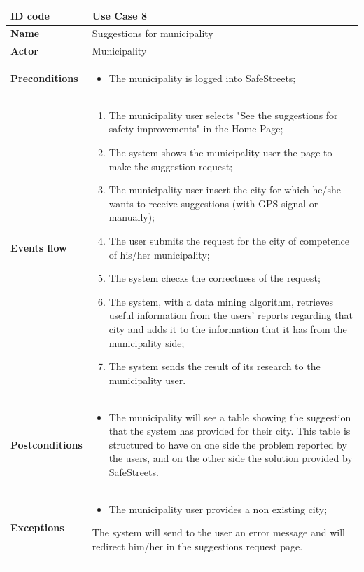 \documentclass[titlepage]{article}
\begin{document}
\newpage



\begin{longtable}{| p{3 cm} | p{10 cm} |} 
\hline

\textbf{ID code} & Use Case 8 \\ \hline
\textbf{Name} & Suggestions for municipality \\ \hline
\textbf{Actor} & Municipality \\ \hline
\textbf{Preconditions} &
\begin{itemize}
\item The municipality is logged into SafeStreets;
\end{itemize} \\ \hline

\textbf{Events flow} & 
\begin{enumerate}
\item The municipality user selects "See the suggestions for safety improvements" in the Home Page;
\item The system shows the municipality user the page to make the suggestion request;
\item The municipality user insert the city for which he/she wants to receive suggestions (with GPS signal or manually);
\item The user submits the request for the city of competence of his/her municipality;
\item The system checks the correctness of the request;
\item The system, with a data mining algorithm, retrieves useful information from the users' reports regarding that city and adds it to the information that it has from the municipality side;
\item The system sends the result of its research to the municipality user.
\end{enumerate} \\ \hline

\textbf{Postconditions} &
\begin{itemize}
\item The municipality will see a table showing the suggestion that the system has provided for their city. This table is structured to have on one side the problem reported by the users, and on the other side the solution provided by SafeStreets.
\end{itemize} \\ \hline

\textbf{Exceptions} &
\begin{itemize}

\item The municipality user provides a non existing city;
\end{itemize}
The system will send to the user an error message and will redirect him/her in the suggestions request page. \\ \hline

\end{longtable}
\end{document}
